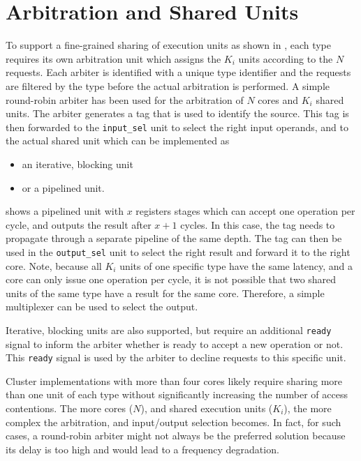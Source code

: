 \documentclass[%
 oneside,      %
 openany,      %
 halfparskip,  %
]{scrbook}
\begin{document}
\section{Arbitration and Shared Units}\label{sharedunit}
To support a fine-grained sharing of execution units as shown in , each type requires its own arbitration unit which assigns the $K_i$ units according to the $N$ requests. Each arbiter is identified with a unique type identifier and the requests are filtered by the type before the actual arbitration is performed.
A simple round-robin arbiter has been used for the arbitration of $N$ cores and $K_i$ shared units.
The arbiter generates a tag that is used to identify the source. This tag is then forwarded to the \texttt{input\_sel} unit to select the right input operands, and to the actual shared unit which can be implemented as
\begin{itemize}
\item an iterative, blocking unit
\item or a pipelined unit.
\end{itemize}
 shows a pipelined unit with $x$ registers stages which can accept one operation per cycle, and outputs the result after $x+1$ cycles. In this case, the tag needs to propagate through a separate pipeline of the same depth. The tag can then be used in the \texttt{output\_sel} unit to select the right result and forward it to the right core. Note, because all $K_i$ units of one specific type have the same latency, and a core can only issue one operation per cycle, it is not possible that two shared units of the same type have a result for the same core. Therefore, a simple multiplexer can be used to select the output.

Iterative, blocking units are also supported, but require an additional \texttt{ready} signal to inform the arbiter whether is ready to accept a new operation or not. This \texttt{ready} signal is used by the arbiter to decline requests to this specific unit.

Cluster implementations with more than four cores likely require sharing more than one unit of each type without significantly increasing the number of access contentions. The more cores ($N$), and shared execution units ($K_i$), the more complex the arbitration, and input/output selection becomes. In fact, for such cases, a round-robin arbiter might not always be the preferred solution because its delay is too high and would lead to a frequency degradation.
\end{document}
